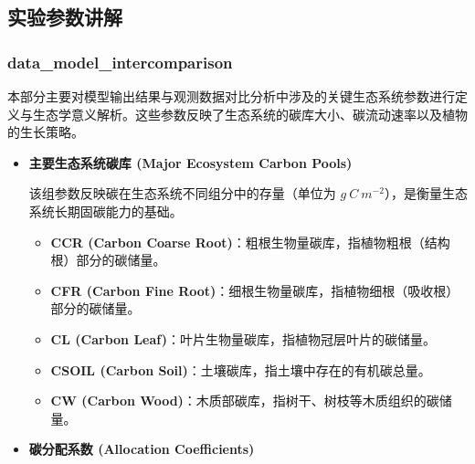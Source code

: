 \documentclass[10pt]{config}
\begin{document}
\subsection{实验参数讲解}

\subsubsection{data\_model\_intercomparison}

本部分主要对模型输出结果与观测数据对比分析中涉及的关键生态系统参数进行定义与生态学意义解析。这些参数反映了生态系统的碳库大小、碳流动速率以及植物的生长策略。

\begin{itemize}
    \item \textbf{主要生态系统碳库 (Major Ecosystem Carbon Pools)}
    
    该组参数反映碳在生态系统不同组分中的存量（单位为 $g~C~m^{-2}$），是衡量生态系统长期固碳能力的基础。
    \begin{itemize}
        \item \textbf{CCR (Carbon Coarse Root)}：粗根生物量碳库，指植物粗根（结构根）部分的碳储量。%
        \item \textbf{CFR (Carbon Fine Root)}：细根生物量碳库，指植物细根（吸收根）部分的碳储量。%
        \item \textbf{CL (Carbon Leaf)}：叶片生物量碳库，指植物冠层叶片的碳储量。%
        \item \textbf{CSOIL (Carbon Soil)}：土壤碳库，指土壤中存在的有机碳总量。%
        \item \textbf{CW (Carbon Wood)}：木质部碳库，指树干、树枝等木质组织的碳储量。%
    \end{itemize}

    \item \textbf{碳分配系数 (Allocation Coefficients)}
    

\end{itemize}
\end{document}
